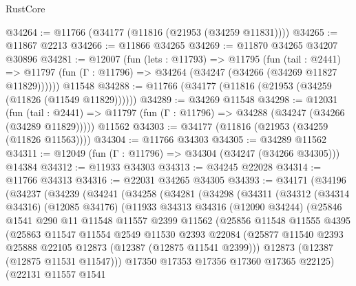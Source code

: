 \begin{lexlean}{RustCore}
\begin{coremodule}
@34264 := @11766 (@34177 (@11816 (@21953 (@34259 @11831))))
@34265 := @11867 @2213
@34266 := @11866 @34265
@34269 := @11870 @34265 @34207 @30896
@34281 := @12007
    (fun (lets : @11793) =>
    @11795
      (fun (tail : @2441) =>
      @11797 (fun (Γ : @11796) => @34264 (@34247 (@34266 (@34269 @11827 @11829))))))
    @11548
@34288 := @11766 (@34177 (@11816 (@21953 (@34259 (@11826 (@11549 @11829))))))
@34289 := @34269 @11548
@34298 := @12031
    (fun (tail : @2441) => @11797 (fun (Γ : @11796) => @34288 (@34247 (@34266 (@34289 @11829)))))
    @11562
@34303 := @34177 (@11816 (@21953 (@34259 (@11826 @11563))))
@34304 := @11766 @34303
@34305 := @34289 @11562
@34311 := @12049 (fun (Γ : @11796) => @34304 (@34247 (@34266 @34305))) @14384
@34312 := @11933 @34303
@34313 := @34245 @22028
@34314 := @11766 @34313
@34316 := @22031 @34265 @34305
@34393 := @34171
    (@34196
      (@34237
        (@34239
          (@34241
            (@34258
              (@34281
                (@34298
                  (@34311
                    (@34312
                      (@34314 @34316)
                      (@12085 @34176)
                      (@11933
                        @34313
                        @34316
                        (@12090 @34244)
                        (@25846
                          @1541
                          @290
                          @11
                          @11548
                          @11557
                          @2399
                          @11562
                          (@25856
                            @11548
                            @11555
                            @4395
                            (@25863
                              @11547
                              @11554
                              @2549
                              @11530
                              @2393
                              @22084
                              (@25877
                                @11540
                                @2393
                                @25888
                                @22105
                                @12873
                                (@12387 (@12875 @11541 @2399)))
                              @12873
                              (@12387 (@12875 @11531 @11547)))
                            @17350
                            @17353
                            @17356
                            @17360
                            @17365
                            @22125)
                          (@22131
                            @11557
                            @1541

\end{coremodule}
\end{lexlean}
